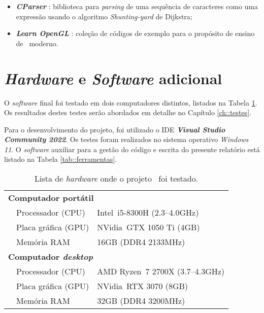 \begin{itemize}
    \item \textbf{\textit{CParser}} : biblioteca para \textit{parsing} de uma sequência de caracteres como uma expressão usando o algoritmo \textit{Shunting-yard} de Dijkstra;
    
    \item \textbf{\textit{Learn OpenGL}} \cite{learnopengl}: coleção de códigos de exemplo para o propósito de ensino de \opengl~moderno.
\end{itemize}


\section{\textit{Hardware} e \textit{Software} adicional}
\label{sec::tecno:hw}

O \textit{software} final foi testado em dois computadores distintos, listados na Tabela \ref{tab::hardware}. Os resultados destes testes serão abordados em detalhe no Capítulo \ref{ch::testes}.

Para o desenvolvimento do projeto, foi utilizado o \ac{IDE} \textbf{\textit{Visual Studio Community 2022}}. Os testes foram realizados no sistema operativo \textit{Windows 11}. O \textit{software} auxiliar para a gestão do código e escrita do presente relatório está listado na Tabela \ref{tab::ferramentas}.

\begin{table}[!p]
	\centering
	\caption[Lista de \textit{hardware} para testes]{Lista de \textit{hardware} onde o projeto \theapp~foi testado.}
	\label{tab::hardware}
	\begin{tabular}{p{1cm} l l}
		\toprule
		\multicolumn{3}{l}{\bfseries Computador portátil} \\
		& Processador (\acs{CPU})   & Intel\registered~i5-8300H (2.3--4.0GHz) \\
		& Placa gráfica (\acs{GPU}) & NVidia\registered~GTX 1050 Ti (4GB) \\
		& Memória \acs{RAM}         & 16GB (DDR4 2133MHz) \\
		\midrule
		\multicolumn{3}{l}{\bfseries Computador \textit{desktop}} \\
		& Processador (\acs{CPU})   & AMD Ryzen\texttrademark~7 2700X (3.7--4.3GHz) \\
		& Placa gráfica (\acs{GPU}) & NVidia\registered~RTX 3070 (8GB) \\
		& Memória \acs{RAM}         & 32GB (DDR4 3200MHz) \\
		\bottomrule
	\end{tabular}
\end{table}


%
